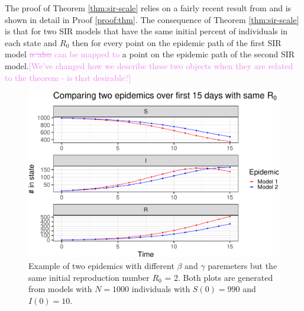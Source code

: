 \documentclass[
  shortnames]{jss}
\begin{document}
The proof of Theorem \ref{thm:sir-scale} relies on a fairly recent
result from \cite{Harko2014} and is shown in detail in Proof
\ref{proof:thm}. The consequence of Theorem \ref{thm:sir-scale} is that
for two SIR models that have the same initial percent of individuals in
each state and \(R_0\) then for every point on the epidemic path of the
first SIR model \textcolor{violet}{\sout{is also} can be mapped to} a
point on the epidemic path of the second SIR
model.\textcolor{violet}{[We've changed how we describe these two objects when they are related to the theorem - is that desirable?]}

\begin{CodeChunk}
\begin{figure}[H]

{\centering \includegraphics{Figs/unnamed-chunk-2-1} 

}

\caption{\label{fig:different-scales-standard}Example of two epidemics with different $\beta$ and $\gamma$ paremeters but the same initial reproduction number $R_0$ = 2.  Both plots are generated from models with $N= 1000$ individuals with $S(0) = 990$ and $I(0) = 10$.}\label{fig:unnamed-chunk-2}
\end{figure}
\end{CodeChunk}
\end{document}
